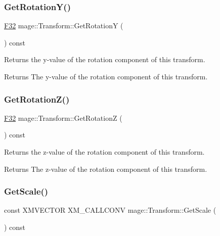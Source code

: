 \subsubsection{\texorpdfstring{Get\+Rotation\+Y()}{GetRotationY()}}
{\footnotesize\ttfamily \mbox{\hyperlink{namespacemage_aa97e833b45f06d60a0a9c4fc22ae02c0}{F32}} mage\+::\+Transform\+::\+Get\+RotationY (\begin{DoxyParamCaption}{ }\end{DoxyParamCaption}) const\hspace{0.3cm}{\ttfamily [noexcept]}}

Returns the y-\/value of the rotation component of this transform.

\begin{DoxyReturn}{Returns}
The y-\/value of the rotation component of this transform. 
\end{DoxyReturn}
\mbox{\label{classmage_1_1_transform_a1c2ae96eb6c0d33afd406ca1685b74f5}} 
\subsubsection{\texorpdfstring{Get\+Rotation\+Z()}{GetRotationZ()}}
{\footnotesize\ttfamily \mbox{\hyperlink{namespacemage_aa97e833b45f06d60a0a9c4fc22ae02c0}{F32}} mage\+::\+Transform\+::\+Get\+RotationZ (\begin{DoxyParamCaption}{ }\end{DoxyParamCaption}) const\hspace{0.3cm}{\ttfamily [noexcept]}}

Returns the z-\/value of the rotation component of this transform.

\begin{DoxyReturn}{Returns}
The z-\/value of the rotation component of this transform. 
\end{DoxyReturn}
\mbox{\label{classmage_1_1_transform_a4b02496d784a0fb8074c89dd9b6580d7}} 
\subsubsection{\texorpdfstring{Get\+Scale()}{GetScale()}}
{\footnotesize\ttfamily const X\+M\+V\+E\+C\+T\+OR X\+M\+\_\+\+C\+A\+L\+L\+C\+O\+NV mage\+::\+Transform\+::\+Get\+Scale (\begin{DoxyParamCaption}{ }\end{DoxyParamCaption}) const\hspace{0.3cm}{\ttfamily [noexcept]}}

